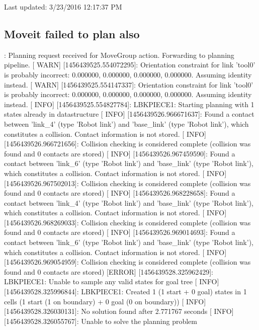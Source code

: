 Last updated\-: 3/23/2016 12\-:17\-:37 P\-M

\subsection*{Moveit failed to plan also }

\begin{DoxyVerb}[ INFO] [1456439525.551846365]: Planning request received for MoveGroup action. Forwarding to planning pipeline.
[ WARN] [1456439525.554072295]: Orientation constraint for link 'tool0' is probably incorrect: 0.000000, 0.000000, 0.000000, 0.000000. Assuming identity instead.
[ WARN] [1456439525.554147337]: Orientation constraint for link 'tool0' is probably incorrect: 0.000000, 0.000000, 0.000000, 0.000000. Assuming identity instead.
[ INFO] [1456439525.554827784]: LBKPIECE1: Starting planning with 1 states already in datastructure
[ INFO] [1456439526.966671637]: Found a contact between 'link_4' (type 'Robot link') and 'base_link' (type 'Robot link'), which constitutes a collision. Contact information is not stored.
[ INFO] [1456439526.966721656]: Collision checking is considered complete (collision was found and 0 contacts are stored)
[ INFO] [1456439526.967459590]: Found a contact between 'link_6' (type 'Robot link') and 'base_link' (type 'Robot link'), which constitutes a collision. Contact information is not stored.
[ INFO] [1456439526.967502013]: Collision checking is considered complete (collision was found and 0 contacts are stored)
[ INFO] [1456439526.968228658]: Found a contact between 'link_4' (type 'Robot link') and 'base_link' (type 'Robot link'), which constitutes a collision. Contact information is not stored.
[ INFO] [1456439526.968269033]: Collision checking is considered complete (collision was found and 0 contacts are stored)
[ INFO] [1456439526.969014693]: Found a contact between 'link_6' (type 'Robot link') and 'base_link' (type 'Robot link'), which constitutes a collision. Contact information is not stored.
[ INFO] [1456439526.969054959]: Collision checking is considered complete (collision was found and 0 contacts are stored)
[ERROR] [1456439528.325962429]: LBKPIECE1: Unable to sample any valid states for goal tree
[ INFO] [1456439528.325996844]: LBKPIECE1: Created 1 (1 start + 0 goal) states in 1 cells (1 start (1 on boundary) + 0 goal (0 on boundary))
[ INFO] [1456439528.326030131]: No solution found after 2.771767 seconds
[ INFO] [1456439528.326055767]: Unable to solve the planning problem
\end{DoxyVerb}


